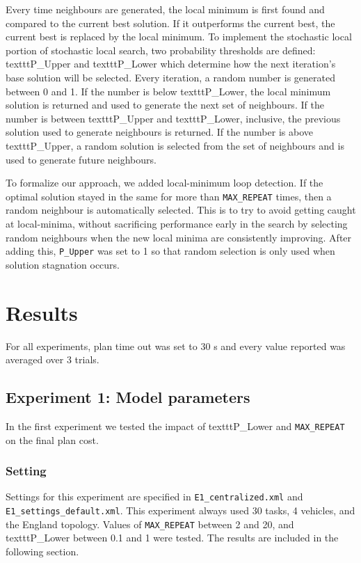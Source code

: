 \documentclass[11pt]{article}
\begin{document}
Every time neighbours are generated, the local minimum is first found and compared to the current best solution. If it outperforms the current best, the current best is replaced by the local minimum. To implement the stochastic local portion of stochastic local search, two probability thresholds are defined: texttt{P\_Upper} and texttt{P\_Lower} which determine how the next iteration's base solution will be selected. Every iteration, a random number is generated between 0 and 1. If the number is below texttt{P\_Lower}, the local minimum solution is returned and used to generate the next set of neighbours. If the number is between texttt{P\_Upper} and texttt{P\_Lower}, inclusive, the previous solution used to generate neighbours is returned. If the number is above texttt{P\_Upper}, a random solution is selected from the set of neighbours and is used to generate future neighbours. 

To formalize our approach, we added local-minimum loop detection. If the optimal solution stayed in the same for more than \texttt{MAX\_REPEAT} times, then a random neighbour is automatically selected. This is to try to avoid getting caught at local-minima, without sacrificing performance early in the search by selecting random neighbours when the new local minima are consistently improving. After adding this, \texttt{P\_Upper} was set to 1 so that random selection is only used when solution stagnation occurs.

\section{Results}
For all experiments, plan time out was set to 30 s and every value reported was averaged over 3 trials. 
\subsection{Experiment 1: Model parameters}
In the first experiment we tested the impact of texttt{P\_Lower} and \texttt{MAX\_REPEAT} on the final plan cost.
\subsubsection{Setting}
Settings for this experiment are specified in \texttt{E1\_centralized.xml} and \texttt{E1\_settings\_default.xml}. This experiment always used 30 tasks, 4 vehicles, and the England topology. Values of \texttt{MAX\_REPEAT} between 2 and 20, and texttt{P\_Lower} between 0.1 and 1 were tested. The results are included in the following section. 
\end{document}
